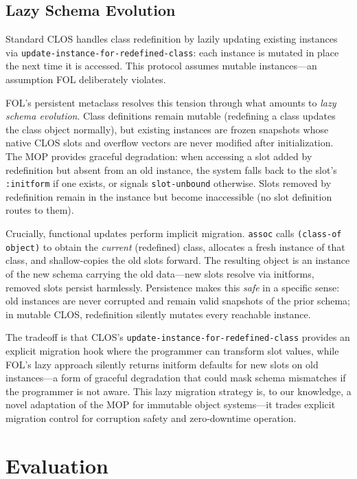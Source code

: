 \documentclass[sigconf,nonacm,review]{acmart}
\begin{document}
\subsection{Lazy Schema Evolution}

Standard CLOS handles class redefinition by lazily updating existing instances via \texttt{update-instance-for-redefined-class}: each instance is mutated in place the next time it is accessed. This protocol assumes mutable instances---an assumption FOL deliberately violates.

FOL's persistent metaclass resolves this tension through what amounts to \textit{lazy schema evolution}. Class definitions remain mutable (redefining a class updates the class object normally), but existing instances are frozen snapshots whose native CLOS slots and overflow vectors are never modified after initialization. The MOP provides graceful degradation: when accessing a slot added by redefinition but absent from an old instance, the system falls back to the slot's \texttt{:initform} if one exists, or signals \texttt{slot-unbound} otherwise. Slots removed by redefinition remain in the instance but become inaccessible (no slot definition routes to them).

Crucially, functional updates perform implicit migration. \texttt{assoc} calls \texttt{(class-of object)} to obtain the \textit{current} (redefined) class, allocates a fresh instance of that class, and shallow-copies the old slots forward. The resulting object is an instance of the new schema carrying the old data---new slots resolve via initforms, removed slots persist harmlessly. Persistence makes this \textit{safe} in a specific sense: old instances are never corrupted and remain valid snapshots of the prior schema; in mutable CLOS, redefinition silently mutates every reachable instance.

The tradeoff is that CLOS's \texttt{update-instance-for-redefined-class} provides an explicit migration hook where the programmer can transform slot values, while FOL's lazy approach silently returns initform defaults for new slots on old instances---a form of graceful degradation that could mask schema mismatches if the programmer is not aware. This lazy migration strategy is, to our knowledge, a novel adaptation of the MOP for immutable object systems---it trades explicit migration control for corruption safety and zero-downtime operation.

\section{Evaluation}
\end{document}
